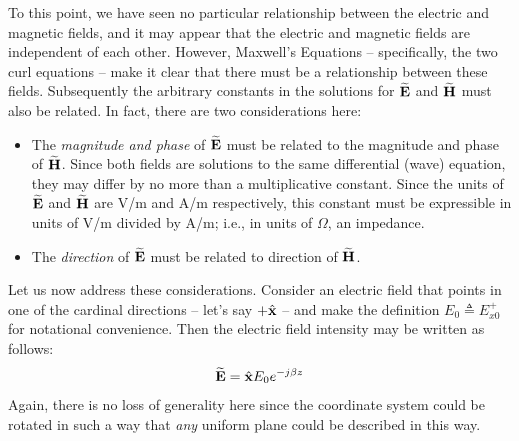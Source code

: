 To this point, we have seen no particular relationship between the electric and magnetic fields, and it may appear that the electric and magnetic fields are independent of each other.
However, Maxwell's Equations -- specifically, the two curl equations -- make it clear that there must be a relationship between these fields.
Subsequently the arbitrary constants in the solutions for $\widetilde{\bf E}$ and $\widetilde{\bf H}$ must also be related.
In fact, there are two considerations here:
%
\begin{itemize}
\item The \emph{magnitude and phase} of $\widetilde{\bf E}$ must be related to the magnitude and phase of $\widetilde{\bf H}$.  
Since both fields are solutions to the same differential (wave) equation, they may differ by no more than a multiplicative constant.
Since the units of $\widetilde{\bf E}$ and $\widetilde{\bf H}$ are V/m and A/m respectively, this constant must be expressible in units of V/m divided by A/m; i.e., in units of $\Omega$, an impedance.
\item The \emph{direction} of $\widetilde{\bf E}$ must be related to direction of $\widetilde{\bf H}$.    
\end{itemize}
%
Let us now address these considerations.
Consider an electric field that points in one of the cardinal directions -- let's say $+\hat{\bf x}$ -- and make the definition $E_0 \triangleq E_{x0}^+$ for notational convenience.
Then the electric field intensity may be written as follows:
%
\begin{equation}
\widetilde{\bf E} = \hat{\bf x}E_0 e^{-j\beta z}
\label{m0038_eEx}
\end{equation}
%
Again, there is no loss of generality here since the coordinate system could be rotated in such a way that \emph{any} uniform plane could be described in this way. 

